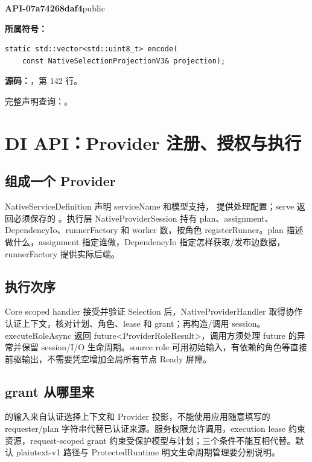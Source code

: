 \textbf{API-07a74268daf4}\quad public\par
\textbf{所属符号：}\par
\begin{Verbatim}[fontsize=\footnotesize,breaklines,breakanywhere]
static std::vector<std::uint8_t> encode(
    const NativeSelectionProjectionV3& projection);
\end{Verbatim}
\textbf{源码：}，第 142 行。\par

完整声明查询：。

\section{DI API：Provider 注册、授权与执行}

\subsection{组成一个 Provider}
NativeServiceDefinition 声明 serviceName 和模型支持， 提供处理配置；serve 返回必须保存的 。执行层 NativeProviderSession 持有 plan、assignment、DependencyIo、runnerFactory 和 worker 数，按角色 registerRunner。plan 描述做什么，assignment 指定谁做，DependencyIo 指定怎样获取/发布边数据，runnerFactory 提供实际后端。

\subsection{执行次序}
Core scoped handler 接受并验证 Selection 后，NativeProviderHandler 取得协作认证上下文，核对计划、角色、lease 和 grant；再构造/调用 session。executeRoleAsync 返回 future<ProviderRoleResult>，调用方须处理 future 的异常并保留 session/I/O 生命周期。source role 可用初始输入，有依赖的角色等直接前驱输出，不需要凭空增加全局所有节点 Ready 屏障。

\subsection{grant 从哪里来}
 的输入来自认证选择上下文和 Provider 投影，不能使用应用随意填写的 requester/plan 字符串代替已认证来源。服务权限允许调用，execution lease 约束资源，request-scoped grant 约束受保护模型与计划；三个条件不能互相代替。默认 plaintext-v1 路径与 ProtectedRuntime 明文生命周期管理要分别说明。

